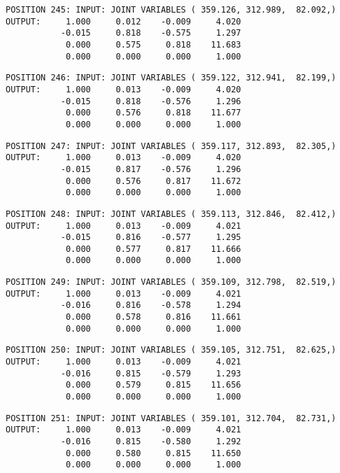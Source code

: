 \begin{verbatim}
POSITION 245: INPUT: JOINT VARIABLES ( 359.126, 312.989,  82.092,)
OUTPUT:     1.000     0.012    -0.009     4.020
           -0.015     0.818    -0.575     1.297
            0.000     0.575     0.818    11.683
            0.000     0.000     0.000     1.000
\end{verbatim} \pagebreak[1]\begin{verbatim}
POSITION 246: INPUT: JOINT VARIABLES ( 359.122, 312.941,  82.199,)
OUTPUT:     1.000     0.013    -0.009     4.020
           -0.015     0.818    -0.576     1.296
            0.000     0.576     0.818    11.677
            0.000     0.000     0.000     1.000
\end{verbatim} \pagebreak[1]\begin{verbatim}
POSITION 247: INPUT: JOINT VARIABLES ( 359.117, 312.893,  82.305,)
OUTPUT:     1.000     0.013    -0.009     4.020
           -0.015     0.817    -0.576     1.296
            0.000     0.576     0.817    11.672
            0.000     0.000     0.000     1.000
\end{verbatim} \pagebreak[1]\begin{verbatim}
POSITION 248: INPUT: JOINT VARIABLES ( 359.113, 312.846,  82.412,)
OUTPUT:     1.000     0.013    -0.009     4.021
           -0.015     0.816    -0.577     1.295
            0.000     0.577     0.817    11.666
            0.000     0.000     0.000     1.000
\end{verbatim} \pagebreak[1]\begin{verbatim}
POSITION 249: INPUT: JOINT VARIABLES ( 359.109, 312.798,  82.519,)
OUTPUT:     1.000     0.013    -0.009     4.021
           -0.016     0.816    -0.578     1.294
            0.000     0.578     0.816    11.661
            0.000     0.000     0.000     1.000
\end{verbatim} \pagebreak[1]\begin{verbatim}
POSITION 250: INPUT: JOINT VARIABLES ( 359.105, 312.751,  82.625,)
OUTPUT:     1.000     0.013    -0.009     4.021
           -0.016     0.815    -0.579     1.293
            0.000     0.579     0.815    11.656
            0.000     0.000     0.000     1.000
\end{verbatim} \pagebreak[1]\begin{verbatim}
POSITION 251: INPUT: JOINT VARIABLES ( 359.101, 312.704,  82.731,)
OUTPUT:     1.000     0.013    -0.009     4.021
           -0.016     0.815    -0.580     1.292
            0.000     0.580     0.815    11.650
            0.000     0.000     0.000     1.000
\end{verbatim} \pagebreak[1]\begin{verbatim}

\end{verbatim}
